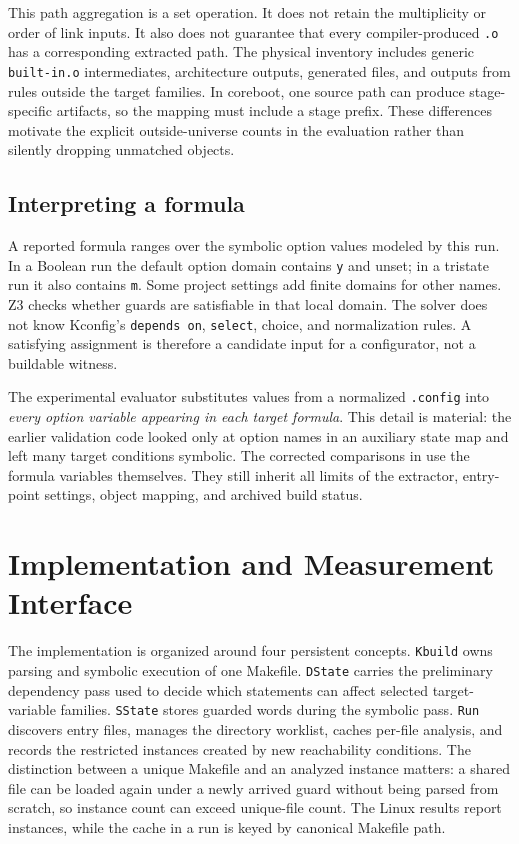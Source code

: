 \documentclass[acmsmall,screen,review]{acmart}
\begin{document}
This path aggregation is a set operation. It does not retain the multiplicity or order of link inputs. It also does not guarantee that every compiler-produced \texttt{.o} has a corresponding extracted path. The physical inventory includes generic \texttt{built-in.o} intermediates, architecture outputs, generated files, and outputs from rules outside the target families. In coreboot, one source path can produce stage-specific artifacts, so the mapping must include a stage prefix. These differences motivate the explicit outside-universe counts in the evaluation rather than silently dropping unmatched objects.

\subsection{Interpreting a formula}
A reported formula ranges over the symbolic option values modeled by this run. In a Boolean run the default option domain contains \texttt{y} and unset; in a tristate run it also contains \texttt{m}. Some project settings add finite domains for other names. Z3 checks whether guards are satisfiable in that local domain. The solver does not know Kconfig's \texttt{depends on}, \texttt{select}, choice, and normalization rules. A satisfying assignment is therefore a candidate input for a configurator, not a buildable witness.

The experimental evaluator substitutes values from a normalized \texttt{.config} into \emph{every option variable appearing in each target formula}. This detail is material: the earlier validation code looked only at option names in an auxiliary state map and left many target conditions symbolic. The corrected comparisons in  use the formula variables themselves. They still inherit all limits of the extractor, entry-point settings, object mapping, and archived build status.

\section{Implementation and Measurement Interface}
\label{sec:implementation}

The implementation is organized around four persistent concepts. \texttt{Kbuild} owns parsing and symbolic execution of one Makefile. \texttt{DState} carries the preliminary dependency pass used to decide which statements can affect selected target-variable families. \texttt{SState} stores guarded words during the symbolic pass. \texttt{Run} discovers entry files, manages the directory worklist, caches per-file analysis, and records the restricted instances created by new reachability conditions. The distinction between a unique Makefile and an analyzed instance matters: a shared file can be loaded again under a newly arrived guard without being parsed from scratch, so instance count can exceed unique-file count. The Linux results report instances, while the cache in a run is keyed by canonical Makefile path.
\end{document}
